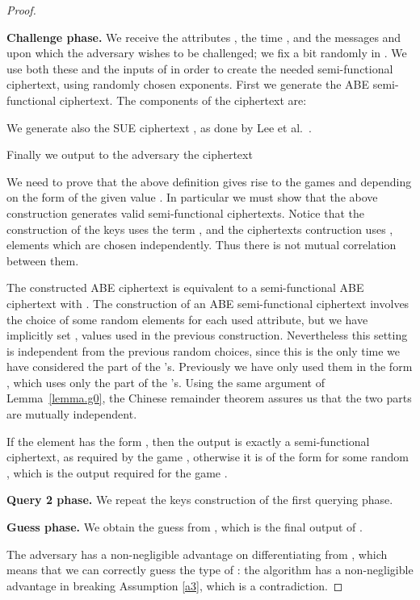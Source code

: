 \documentclass[a4paper,10pt]{article}
\newcommand{\game}[2]{}
\newcommand{\phase}[1]{\textbf{#1 phase.} \hspace{0pt}}
\begin{document}
\begin{proof}
\begin{itemize}
	\end{itemize}
	
	\phase{Challenge}
	We receive the attributes , the time , and the messages  and  upon which the adversary wishes to be challenged; we fix a bit  randomly in .
	We use both these and the inputs of  in order to create the needed semi-functional ciphertext, using randomly chosen exponents.
	First we generate the ABE semi-functional ciphertext.
	The components of the ciphertext are:
		
	We generate also the SUE ciphertext , as done by Lee et al.~\cite{lee2013RSABE}.
	
	Finally we output to the adversary the ciphertext
	
	
	We need to prove that the above definition gives rise to the games \game{G}{2} and \game{G}{3} depending on the form of the given value . In particular we must show that the above construction generates valid semi-functional ciphertexts. Notice that the construction of the keys uses the term , and the ciphertexts contruction uses , elements which are chosen independently. Thus there is not mutual correlation between them.
	
	The constructed ABE ciphertext is equivalent to a semi-functional ABE ciphertext with . The construction of an ABE semi-functional ciphertext involves the choice of some random elements  for each used attribute, but we have implicitly set , values used in the previous construction. Nevertheless this setting is independent from the previous random choices, since this is the only time we have considered the  part of the 's.
Previously we have only used them in the form , which uses only the  part of the 's. Using the same argument of Lemma~\ref{lemma.g0}, the Chinese remainder theorem assures us that the two parts are mutually independent.
	
	If the element  has the form , then the output is exactly a semi-functional ciphertext, as required by the game \game{G}{2}, otherwise it is of the form  for some random , which is the output required for the game \game{G}{3}.
	
	\phase{Query 2}
	We repeat the keys construction of the first querying phase.
	
	\phase{Guess}
	We obtain the guess  from , which is the final output of .
	
	The adversary  has a non-negligible advantage on differentiating \game{G}{2} from \game{G}{3}, which means that we can correctly guess the type of : the algorithm  has a non-negligible advantage in breaking Assumption \ref{a3}, which is a contradiction.
	\end{proof}
	
\end{document}
